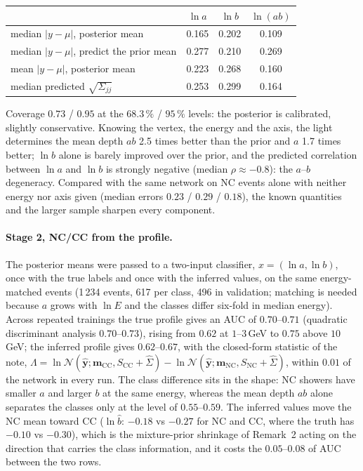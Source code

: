 \documentclass[11pt]{article}
\theoremstyle{definition}
\newcommand{\y}{\bm{y}}
\newcommand{\N}{\mathcal{N}}
\begin{document}
\begin{center}
\begin{tabular}{lccc}
\toprule
 & $\ln a$ & $\ln b$ & $\ln(ab)$\\
\midrule
median $|y-\mu|$, posterior mean   & 0.165 & 0.202 & 0.109\\
median $|y-\mu|$, predict the prior mean & 0.277 & 0.210 & 0.269\\
mean $|y-\mu|$, posterior mean     & 0.223 & 0.268 & 0.160\\
median predicted $\sqrt{\Sigma_{jj}}$ & 0.253 & 0.299 & 0.164\\
\bottomrule
\end{tabular}
\end{center}
Coverage $0.73$ / $0.95$ at the $68.3\,\%$ / $95\,\%$ levels: the posterior is calibrated, slightly
conservative. Knowing the vertex, the energy and the axis, the light determines the mean depth $ab$ 2.5 times
better than the prior and $a$ 1.7 times better; $\ln b$ alone is barely improved over the prior, and the
predicted correlation between $\ln a$ and $\ln b$ is strongly negative (median $\rho\approx-0.8$): the
$a$--$b$ degeneracy. Compared with the same network on NC events alone with neither energy nor axis given
(median errors $0.23$ / $0.29$ / $0.18$), the known quantities and the larger sample sharpen every component.

\paragraph{Stage 2, NC/CC from the profile.}
The posterior means were passed to a two-input classifier, $x=(\ln a,\ln b)$, once with the true labels and once
with the inferred values, on the same energy-matched events (1\,234 events, 617 per class, 496 in validation;
matching is needed because $a$ grows with $\ln E$ and the classes differ six-fold in median energy). Across
repeated trainings the true profile gives an AUC of $0.70$--$0.71$ (quadratic discriminant analysis
$0.70$--$0.73$), rising from $0.62$ at $1$--$3$\,GeV to $0.75$ above $10$\,GeV; the inferred profile gives
$0.62$--$0.67$, with the closed-form statistic of the note,
$\Lambda=\ln\N(\hat{\y};\bm m_{\mathrm{CC}},S_{\mathrm{CC}}+\hat\Sigma)-\ln\N(\hat{\y};\bm m_{\mathrm{NC}},S_{\mathrm{NC}}+\hat\Sigma)$,
within $0.01$ of the network in every run. The class difference sits in the shape: NC showers have smaller $a$ and
larger $b$ at the same energy, whereas the mean depth $ab$ alone separates the classes only at the level of
$0.55$--$0.59$. The inferred values move the NC mean toward CC ($\ln\hat b$: $-0.18$ vs $-0.27$ for NC and CC, where
the truth has $-0.10$ vs $-0.30$), which is the mixture-prior shrinkage of Remark~2 acting on the direction that
carries the class information, and it costs the $0.05$--$0.08$ of AUC between the two rows.
\end{document}
